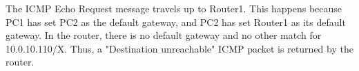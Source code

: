 The ICMP Echo Request message travels up to Router1. This happens because PC1 has set PC2 as the default gateway, and PC2 has set Router1 as its default gateway. In the router, there is no default gateway and no other match for 10.0.10.110/X. Thus, a "Destination unreachable" ICMP packet is returned by the router.